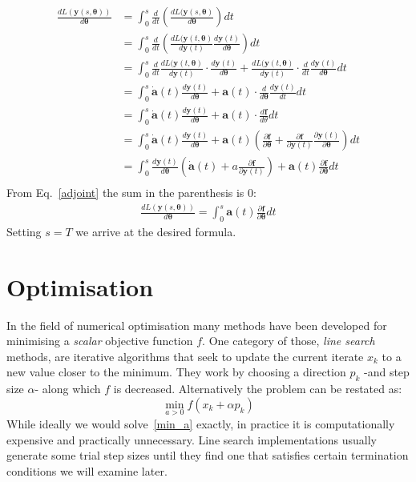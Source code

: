 \documentclass[11pt]{report}
\begin{document}
    \begin{align*}
        \frac{ d L(\bm{y}(s, \bm{\theta})) }{ d \bm{\theta} }
        &= \int_0^s \frac{d}{dt} \left( \frac{ d L(\bm{y}(s, \bm{\theta})}{ d \bm{\theta}} \right) dt \\
        &= \int_0^s \frac{d}{dt} \left( \frac{ d L(\bm{y}(t, \bm{\theta})}{ d \bm{y}(t)} \frac{d \bm{y}(t)}{d\bm{\theta}} \right) dt \\
        &= \int_0^s
        \frac{d}{dt} \frac{ d L(\bm{y}(t, \bm{\theta})}{ d \bm{y}(t)} \cdot \frac{d \bm{y}(t)}{d\bm{\theta}}
        +
        \frac{ d L(\bm{y}(t, \bm{\theta})}{ d \bm{y}(t)} \cdot \frac{d}{dt} \frac{d \bm{y}(t)}{d\bm{\theta}}
        dt \\
        &= \int_0^s
        \dot{\bm{a}}(t) \frac{d \bm{y}(t)}{d\bm{\theta}}
        +
        \bm{a}(t) \cdot \frac{d}{d\bm{\theta}} \frac{d \bm{y}(t)}{dt}
        dt \\
        &= \int_0^s
        \dot{\bm{a}}(t) \frac{d \bm{y}(t)}{d\bm{\theta}}
        +
        \bm{a}(t) \cdot \frac{d\bm{f}}{d\theta}
        dt \\
        &= \int_0^s
        \dot{\bm{a}}(t) \frac{d \bm{y}(t)}{d\bm{\theta}}
        +
        \bm{a}(t) \left( \frac{\partial \bm{f}}{\partial \bm{\theta}}
        +
        \frac{\partial \bm{f}}{\partial \bm{y}(t)} \frac{\partial \bm{y}(t)}{\partial \bm{\theta}}\right)
        dt \\
        &= \int_0^s
        \frac{d \bm{y}(t)}{d\bm{\theta}}
        \left( \dot{\bm{a}}(t) + a\frac{\partial \bm{f}}{\partial \bm{y}(t)} \right)
        +
        \bm{a}(t) \frac{\partial \bm{f}}{\partial \bm{\theta}}
        dt \\
    \end{align*}
    From Eq.~\eqref{adjoint} the sum in the parenthesis is 0:
    \begin{align}
        \frac{ d L(\bm{y}(s, \bm{\theta})) }{ d \bm{\theta} }
        = \int_0^s
        \bm{a}(t) \frac{\partial \bm{f}}{\partial \bm{\theta}}
        dt
    \end{align}
    Setting $s=T$ we arrive at the desired formula.


    \chapter{Optimisation}
    In the field of numerical optimisation many methods have been developed for minimising a \textit{scalar} objective function $f$.
    One category of those, \textit{line search} methods, are iterative algorithms that seek to update the current iterate $x_k$ to a new value closer to the minimum.
    They work by choosing a direction $p_k$ -and step size $\alpha$- along which $f$ is decreased.
    Alternatively the problem can be restated as:
    \begin{equation}
        \min_{a>0} f(x_k + \alpha p_k) \label{min_a}
    \end{equation}
    While ideally we would solve~\eqref{min_a} exactly, in practice it is computationally expensive and practically unnecessary.
    Line search implementations usually generate some trial step sizes until they find one that satisfies certain termination conditions we will examine later.
\end{document}

